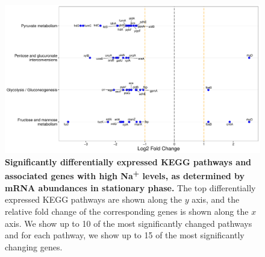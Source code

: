 \documentclass[a4paper]{article}
\begin{document}
\clearpage
\begin{figure}
	\includegraphics[width=1.0\textwidth]{../../d_figures/kegg_15.pdf}
	\caption[Significantly differentially expressed KEGG pathways for mRNA samples in stationary phase tested for high Na\textsuperscript{+} against base Na\textsuperscript{+}]
	{\textbf{Significantly differentially expressed KEGG pathways and associated genes with high Na\textsuperscript{+} levels, as determined by mRNA abundances in stationary phase.} The top differentially expressed KEGG pathways are shown along the $y$ axis, and the relative fold change of the corresponding genes is shown along the $x$ axis. We show up to 10 of the most significantly changed pathways and for each pathway, we show up to 15 of the most significantly changing genes.}
\end{figure}
\end{document}
